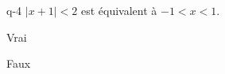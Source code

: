 \begin{truefalse}{q-4}
$|x+1|<2$ est équivalent à $-1 < x < 1$.
\item Vrai
\item* Faux
\end{truefalse}


